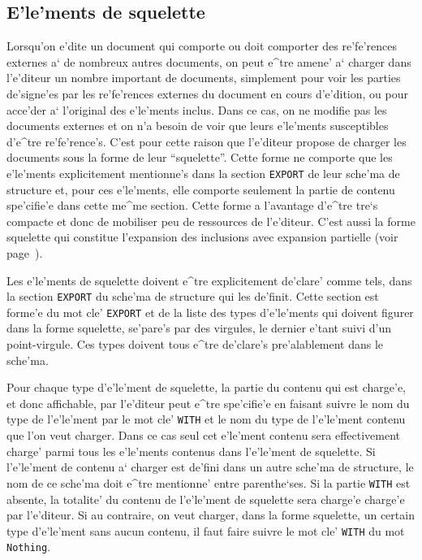 {\subsection{E'le'ments de squelette}
\label{squelette}

Lorsqu'on e'dite un document qui comporte ou doit comporter des re'fe'rences externes a`
de nombreux autres documents, on peut e^tre amene' a` charger dans l'e'diteur
un nombre important de documents, simplement pour voir les parties
de'signe'es par les re'fe'rences externes du document en cours d'e'dition,
ou pour acce'der a` l'original des e'le'ments inclus.
Dans ce cas, on ne modifie pas les documents externes et on n'a besoin de
voir que leurs e'le'ments susceptibles d'e^tre re'fe'rence's. C'est pour cette
raison que l'e'diteur propose de charger les documents sous la forme de
leur ``squelette''. Cette forme ne comporte que les e'le'ments explicitement
mentionne's dans la section {\tt EXPORT} de leur sche'ma de structure
et, pour ces e'le'ments, elle comporte seulement la partie de contenu
spe'cifie'e dans cette me^me section. Cette forme a l'avantage d'e^tre
tre`s compacte et donc de mobiliser peu de ressources de l'e'diteur.
C'est aussi la forme squelette qui constitue l'expansion des inclusions avec
expansion partielle (voir page~\pageref{inclusion}).

Les e'le'ments de squelette doivent e^tre explicitement de'clare' comme tels,
dans la section {\tt EXPORT} du sche'ma de structure qui les de'finit.
Cette section est forme'e du mot cle' {\tt EXPORT} et de la liste des
types d'e'le'ments qui doivent figurer dans la forme squelette, se'pare's par
des virgules, le dernier e'tant suivi d'un point-virgule. Ces types doivent
tous e^tre de'clare's pre'alablement dans le sche'ma.

Pour chaque type d'e'le'ment de squelette, la partie du contenu qui est
charge'e, et donc affichable, par l'e'diteur peut e^tre spe'cifie'e en faisant
suivre le nom du type de l'e'le'ment par le mot cle' {\tt WITH}
et le nom du type de l'e'le'ment contenu que l'on veut charger. Dans ce cas
seul cet e'le'ment contenu sera effectivement charge' parmi tous les
e'le'ments contenus dans l'e'le'ment de squelette. Si l'e'le'ment de contenu
a` charger est de'fini dans un autre sche'ma de structure, le nom de ce
sche'ma doit e^tre mentionne' entre parenthe`ses.
Si la partie {\tt WITH} est absente, la totalite' du contenu de l'e'le'ment
de squelette sera charge'e charge'e par l'e'diteur.
Si au contraire, on veut charger, dans la forme squelette, un certain
type d'e'le'ment sans aucun contenu, il faut faire suivre le mot cle'
{\tt WITH} du mot {\tt Nothing}.

}
